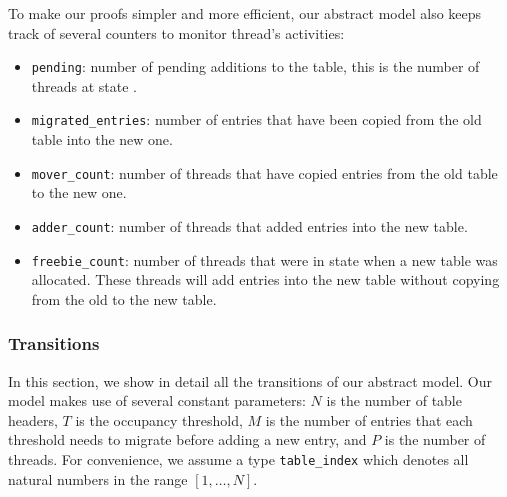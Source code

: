 To make our proofs simpler and more efficient, our abstract model also
keeps track of several counters to monitor thread's activities:

\begin{itemize}

\item \texttt{pending}: number of pending additions to the table, this
  is the number of threads at state \pcone.

\item \texttt{migrated\_entries}: number of entries that have been
  copied from the old table into the new one.

\item \texttt{mover\_count}: number of threads that have copied
  entries from the old table to the new one.

\item \texttt{adder\_count}: number of threads that added entries into
  the new table.
  
\item \texttt{freebie\_count}: number of threads that were in state
  \pcone when a new table was allocated. These threads will add
  entries into the new table without copying from the old to the new
  table.

\end{itemize}  

\subsubsection{Transitions}

In this section, we show in detail all the transitions of our abstract
model. Our model makes use of several constant parameters: $N$ is the
number of table headers, $T$ is the occupancy threshold, $M$ is the number of
entries that each threshold needs to migrate before adding a new
entry, and $P$ is the number of threads. For convenience, we assume a
type \texttt{table\_index} which denotes all natural numbers in the
range $[1,\ldots,N]$.


